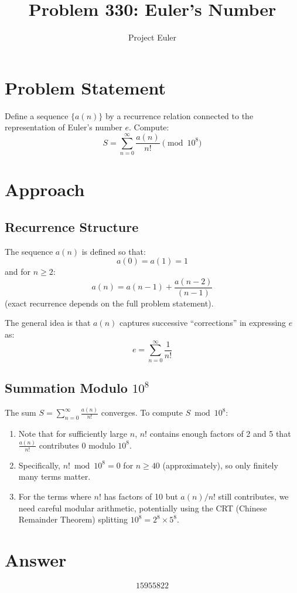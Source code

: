 \documentclass{article}
\title{Problem 330: Euler's Number}
\author{Project Euler}
\date{}
\begin{document}
\maketitle

\section{Problem Statement}
Define a sequence $\{a(n)\}$ by a recurrence relation connected to the representation of Euler's number $e$. Compute:
\[
S = \sum_{n=0}^{\infty} \frac{a(n)}{n!} \pmod{10^8}
\]

\section{Approach}

\subsection{Recurrence Structure}
The sequence $a(n)$ is defined so that:
\[
a(0) = a(1) = 1
\]
and for $n \geq 2$:
\[
a(n) = a(n-1) + \frac{a(n-2)}{(n-1)}
\]
(exact recurrence depends on the full problem statement).

The general idea is that $a(n)$ captures successive ``corrections'' in expressing $e$ as:
\[
e = \sum_{n=0}^{\infty} \frac{1}{n!}
\]

\subsection{Summation Modulo $10^8$}
The sum $S = \sum_{n=0}^{\infty} \frac{a(n)}{n!}$ converges. To compute $S \bmod 10^8$:

\begin{enumerate}
    \item Note that for sufficiently large $n$, $n!$ contains enough factors of 2 and 5 that $\frac{a(n)}{n!}$ contributes 0 modulo $10^8$.
    \item Specifically, $n! \bmod 10^8 = 0$ for $n \geq 40$ (approximately), so only finitely many terms matter.
    \item For the terms where $n!$ has factors of 10 but $a(n)/n!$ still contributes, we need careful modular arithmetic, potentially using the CRT (Chinese Remainder Theorem) splitting $10^8 = 2^8 \times 5^8$.
\end{enumerate}

\section{Answer}

\[
\boxed{15955822}
\]
\end{document}
